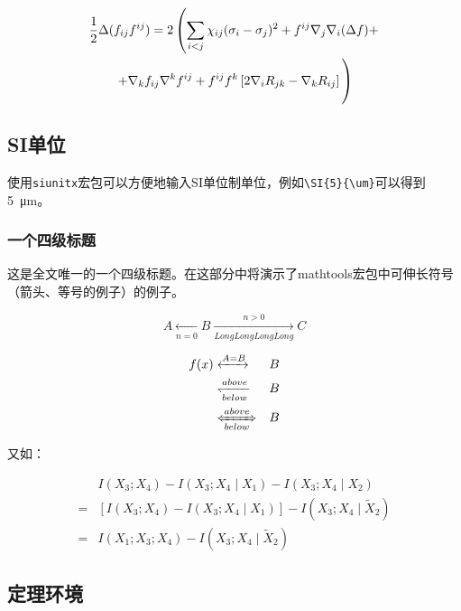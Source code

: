 \begin {multline}
  \frac {1}{2}\Delta (f_{ij}f^{ij})=
  2\left (\sum _{i<j}\chi _{ij}(\sigma _{i}-
    \sigma _{j}) ^{2}+ f^{ij}\nabla _{j}\nabla _{i}(\Delta f)+\right .\\
  \left .+\nabla _{k}f_{ij}\nabla ^{k}f^{ij}+
    f^{ij}f^{k}\left [2\nabla _{i}R_{jk}-
      \nabla _{k}R_{ij}\right ]\vphantom {\sum _{i<j}}\right )
\end{multline}

\subsection{SI单位}

使用\verb+siunitx+宏包可以方便地输入SI单位制单位，例如\verb+\SI{5}{\um}+可以得到\SI{5}{\um}。

\subsubsection{一个四级标题}
\label{sec:depth4}

这是全文唯一的一个四级标题。在这部分中将演示了mathtools宏包中可伸长符号（箭头、等号的例子）的例子。

\begin{displaymath}
    A \xleftarrow[n=0]{} B \xrightarrow[LongLongLongLong]{n>0} C
\end{displaymath}

\begin{eqnarray}
  f(x) & \xleftrightarrow[]{A=B}  & B \\
  & \xleftharpoondown[below]{above} & B \nonumber \\
  & \xLeftrightarrow[below]{above} & B
\end{eqnarray}

又如：

\begin{align}
  \label{eq:none}
  & I(X_3;X_4)-I(X_3;X_4\mid{}X_1)-I(X_3;X_4\mid{}X_2) \nonumber \\
  = & [I(X_3;X_4)-I(X_3;X_4\mid{}X_1)]-I(X_3;X_4\mid{}\tilde{X}_2) \\
  = & I(X_1;X_3;X_4)-I(X_3;X_4\mid{}\tilde{X}_2)
\end{align}

\subsection{定理环境}

